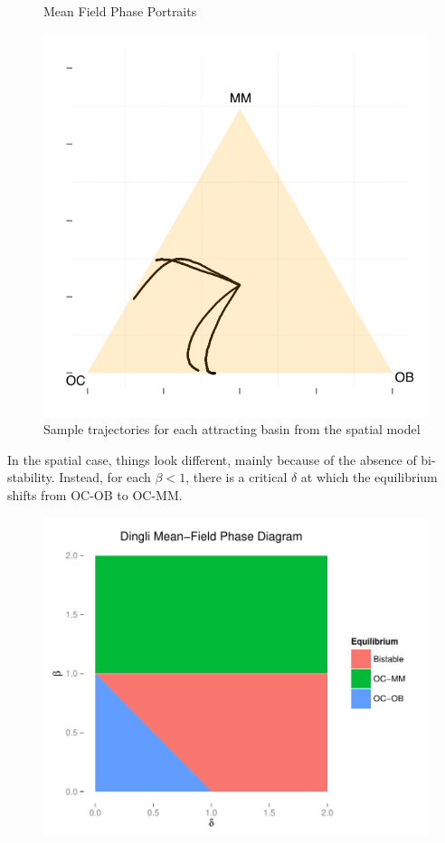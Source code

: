 \documentclass[12pt]{report}
\begin{document}
\begin{figure}[htb]
\caption{Mean Field Phase Portraits}
\end{figure}

\begin{figure}[H]
\centering
\includegraphics[width = 0.4 \linewidth]{Diagrams/dingli_trajectories}
\caption{Sample trajectories for each attracting basin from the spatial model}
\end{figure}
In the spatial case, things look different, mainly because of the absence of bi-stability. Instead, for each $\beta < 1$, there is a critical $\delta$ at which the equilibrium shifts from OC-OB to OC-MM.  

\pagebreak


\begin{figure}
\centering
\includegraphics[width = 0.8 \linewidth]{Diagrams/dingli_phase-mf}
\end{figure}
\end{document}
